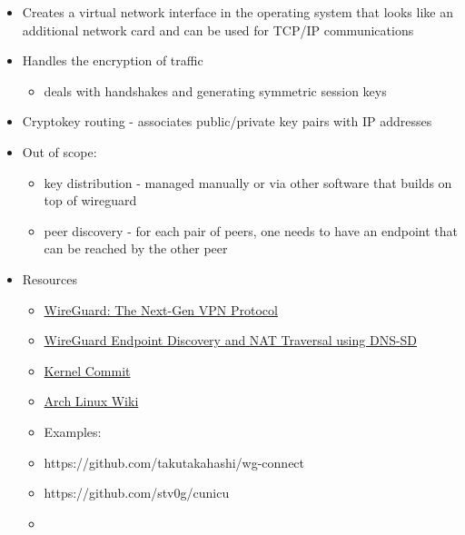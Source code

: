 \begin{itemize}
\tightlist
\item
  Creates a virtual network interface in the operating system that looks
  like an additional network card and can be used for TCP/IP
  communications
\item
  Handles the encryption of traffic

  \begin{itemize}
  \tightlist
  \item
    deals with handshakes and generating symmetric session keys
  \end{itemize}
\item
  Cryptokey routing - associates public/private key pairs with IP
  addresses
\item
  Out of scope:

  \begin{itemize}
  \tightlist
  \item
    key distribution - managed manually or via other software that
    builds on top of wireguard
  \item
    peer discovery - for each pair of peers, one needs to have an
    endpoint that can be reached by the other peer
  \end{itemize}
\item
  Resources

  \begin{itemize}
  \tightlist
  \item
    \href{https://blogs.keysight.com/blogs/tech/nwvs.entry.html/2022/09/22/wireguard_the_next-genvpnprotocol-OcEz.html}{WireGuard:
    The Next-Gen VPN Protocol}
  \item
    \href{https://www.jordanwhited.com/posts/wireguard-endpoint-discovery-nat-traversal/}{WireGuard
    Endpoint Discovery and NAT Traversal using DNS-SD}
  \item
    \href{https://git.kernel.org/pub/scm/linux/kernel/git/torvalds/linux.git/commit/?id=e7096c131e5161fa3b8e52a650d7719d2857adfd}{Kernel
    Commit}
  \item
    \href{https://wiki.archlinux.org/title/WireGuard}{Arch Linux Wiki}
  \item
    Examples:
  \item
    https://github.com/takutakahashi/wg-connect
  \item
    https://github.com/stv0g/cunicu
  \item
  \end{itemize}
\end{itemize}


